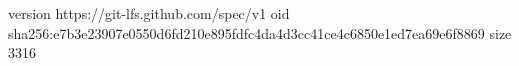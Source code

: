 version https://git-lfs.github.com/spec/v1
oid sha256:e7b3e23907e0550d6fd210e895fdfc4da4d3cc41ce4c6850e1ed7ea69e6f8869
size 3316
